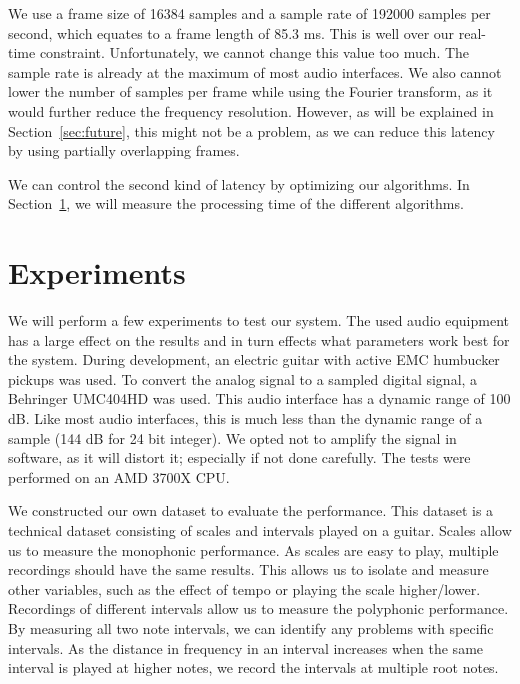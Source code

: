 \documentclass[10pt,twocolumn]{article}
\begin{document}
We use a frame size of 16384 samples and a sample rate of 192000 samples per second, which equates to a frame length of 85.3 ms. This is well over our real-time constraint. Unfortunately, we cannot change this value too much. The sample rate is already at the maximum of most audio interfaces. We also cannot lower the number of samples per frame while using the Fourier transform, as it would further reduce the frequency resolution. However, as will be explained in Section~\ref{sec:future}, this might not be a problem, as we can reduce this latency by using partially overlapping frames.

We can control the second kind of latency by optimizing our algorithms. In Section~\ref{sec:exp}, we will measure the processing time of the different algorithms.


\section{Experiments}  \label{sec:exp}
We will perform a few experiments to test our system. The used audio equipment has a large effect on the results and in turn effects what parameters work best for the system. During development, an electric guitar with active EMC humbucker pickups was used. To convert the analog signal to a sampled digital signal, a Behringer UMC404HD was used. This audio interface has a dynamic range of 100 dB. Like most audio interfaces, this is much less than the dynamic range of a sample (144 dB for 24 bit integer). We opted not to amplify the signal in software, as it will distort it; especially if not done carefully. The tests were performed on an AMD 3700X CPU.
%

We constructed our own dataset to evaluate the performance. This dataset is a technical dataset consisting of scales and intervals played on a guitar. Scales allow us to measure the monophonic performance. As scales are easy to play, multiple recordings should have the same results. This allows us to isolate and measure other variables, such as the effect of tempo or playing the scale higher/lower. Recordings of different intervals allow us to measure the polyphonic performance. By measuring all two note intervals, we can identify any problems with specific intervals. As the distance in frequency in an interval increases when the same interval is played at higher notes, we record the intervals at multiple root notes.%
\end{document}
